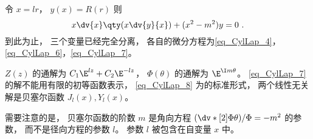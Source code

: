 令 $x = lr$，   $y(x) = R(r)$ 则
\begin{equation}\label{eq_CylLap_8} 
x \dv{x} \qty(x\dv{y}{x}) + (x^2 - m^2)y = 0~.
\end{equation}
到此为止， 三个变量已经完全分离， 各自的微分方程为\autoref{eq_CylLap_4}， \autoref{eq_CylLap_6}，\autoref{eq_CylLap_7}。

$Z(z)$ 的通解为 $C_1\E^{lz} + C_2 \E^{-lz}$，   $\Phi(\theta)$ 的通解为 $\E^{\I m\theta}$。   \autoref{eq_CylLap_7} 的解不能用有限的初等函数表示， \autoref{eq_CylLap_8} 为的标准形式， 两个线性无关解是贝塞尔函数 $J_l(x), Y_l(x)$。

需要注意的是， 贝塞尔函数的阶数 $m$ 是角向方程 $(\dv*[2]{\Phi}{\theta})/\Phi = -m^2$ 的参数， 而不是径向方程的参数 $l$。 参数 $l$ 被包含在自变量 $x$ 中。
